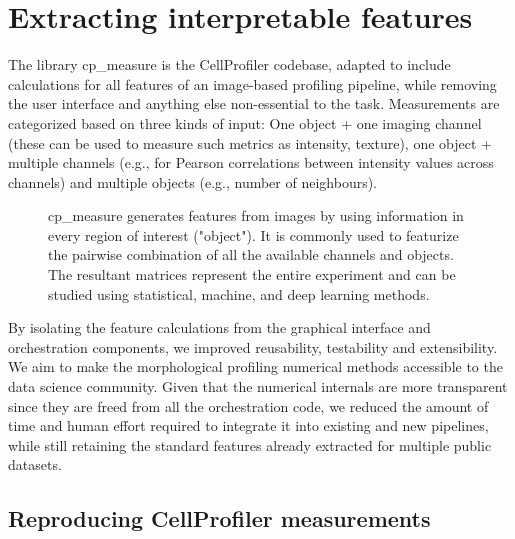 \documentclass{article}
\begin{document}
\section{Extracting interpretable features}
\label{sec:org61842b5}
The library cp\_measure is  the CellProfiler codebase, adapted to include calculations for all features of an image-based profiling pipeline, while removing the user interface and anything else non-essential to the task. Measurements are categorized based on three kinds of input: One object + one imaging channel (these can be used to measure such metrics as intensity, texture), one object + multiple channels (e.g., for Pearson correlations between intensity values across channels) and multiple objects (e.g., number of neighbours).

\begin{figure}[htbp]
\centering

\caption{\label{fig:overview}cp\_measure generates features from images by using information in every region of interest ("object"). It is commonly used to featurize the pairwise combination of all the available channels and objects. The resultant matrices represent the entire experiment and can be studied using statistical, machine, and deep learning methods.}
\end{figure}

By isolating the feature calculations from the graphical interface and orchestration components, we improved reusability, testability and extensibility. We aim to make the morphological profiling numerical methods accessible to the data science community. Given that the numerical internals are more transparent since they are freed from all the orchestration code, we reduced the amount of time and human effort required to integrate it into existing and new pipelines, while still retaining the standard features already extracted for multiple public datasets.

\subsection{Reproducing CellProfiler measurements}
\label{sec:org09b0cd2}
\end{document}
